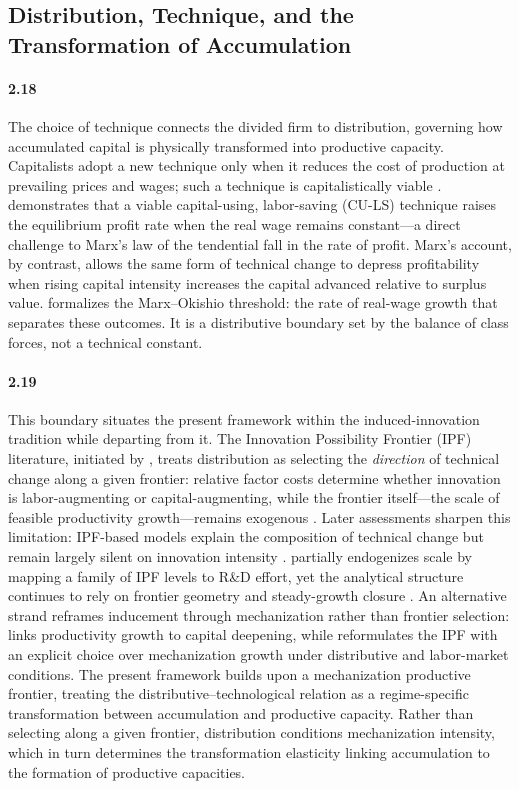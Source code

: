 \subsection{Distribution, Technique, and the Transformation
	of Accumulation}

\paragraph{2.18}
The choice of technique connects the divided firm to
distribution, governing how accumulated capital is physically
transformed into productive capacity. Capitalists adopt a new
technique only when it reduces the cost of production at
prevailing prices and wages; such a technique is capitalistically
viable \citep{Okishio1961}. \citet{Okishio1961} demonstrates
that a viable capital-using, labor-saving (CU-LS) technique
raises the equilibrium profit rate when the real wage remains
constant---a direct challenge to Marx's law of the tendential
fall in the rate of profit. Marx's account, by contrast, allows
the same form of technical change to depress profitability when
rising capital intensity increases the capital advanced relative
to surplus value. \citet{Basu2022} formalizes the
Marx--Okishio threshold: the rate of real-wage growth that
separates these outcomes. It is a distributive boundary set by
the balance of class forces, not a technical constant.

\paragraph{2.19}
This boundary situates the present framework within the
induced-innovation tradition while departing from it. The
Innovation Possibility Frontier (IPF) literature, initiated by
\citet{Kennedy1964}, treats distribution as selecting the
\textit{direction} of technical change along a given frontier:
relative factor costs determine whether innovation is
labor-augmenting or capital-augmenting, while the frontier
itself---the scale of feasible productivity growth---remains
exogenous \citep{Julius2005, Tavani2012}. Later assessments
sharpen this limitation: IPF-based models explain the
composition of technical change but remain largely silent on
innovation intensity \citep{TavaniZamparelli2018}.
\citet{Zamparelli2024a} partially endogenizes scale by mapping
a family of IPF levels to R\&D effort, yet the analytical
structure continues to rely on frontier geometry and
steady-growth closure \citep{Zamparelli2024b}. An alternative
strand reframes inducement through mechanization rather than
frontier selection: \citet{Kaldor1957} links productivity
growth to capital deepening, while
\citet{CajasGuajirro2024} reformulates the IPF with an explicit
choice over mechanization growth under distributive and
labor-market conditions. The present framework builds upon a 
mechanization productive frontier,  treating the distributive--technological 
relation as a regime-specific transformation between accumulation and
productive capacity. Rather than selecting along a given
frontier, distribution conditions mechanization intensity,
which in turn determines the transformation elasticity linking
accumulation to the formation of productive capacities. 

